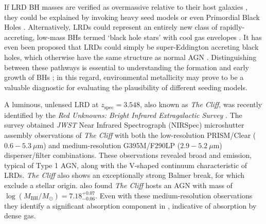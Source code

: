\documentclass[fleqn,usenatbib]{mnras}
\newcommand{\jwst}{\textit{JWST}\xspace}
\newcommand{\Halpha}{\text{H\textalpha}\xspace}
\newcommand{\Hbeta}{\text{H\textbeta}\xspace}
\newcommand{\cliff}{\textit{The Cliff}\xspace}
\begin{document}
If LRD BH masses are verified as overmassive relative to their host galaxies \citep[see][for example]{Juodzbalis2025_QSO1}, they could be explained by invoking heavy seed models or even Primordial Black Holes \citep[PBHs; see e.g.][]{Dayal2024, DayalMaiolino2026, Zhang2025_hydrosim,Ziparo2025}. Alternatively, LRDs could represent an entirely new class of rapidly-accreting, low-mass BHs termed `black hole stars' \citep[][]{Naidu2025, Begelman2026} with cool gas envelopes \citep{Liu2025, Kido2025}. 
It has even been proposed that LRDs could simply be super-Eddington accreting black holes, which otherwise have the same structure as normal AGN \citep[][]{MadauMaiolino2026,Madau2026b}. Distinguishing between these pathways is essential to understanding the formation and early growth of BHs \citep[e.g.,][]{Jeon_LRDs2026}; in this regard, environmental metallicity may prove to be a valuable diagnostic for evaluating the plausibility of different seeding models.




A luminous, unlensed LRD at $z_\mathrm{spec} = 3.548$, also known as \cliff, was recently identified by the \textit{Red Unknowns: Bright Infrared Extragalactic Survey} \citep[RUBIES;][]{RUBIES2025, deGraaff2025}. 
The survey obtained \jwst Near Infrared Spectrograph (NIRSpec) microshutter assembly \citep[MSA;][]{Jakobsen2022,Ferruit2022} observations of \cliff with both the low-resolution PRISM/Clear ($0.6 - 5.3 \ \mu$m) and medium-resolution G395M/F290LP ($2.9 - 5.2 ~\mu$m) disperser/filter combinations. 
These observations revealed broad \Hbeta and \Halpha emission, typical of Type 1 AGN, along with the V-shaped continuum characteristic of LRDs. 
\cliff also shows an exceptionally strong Balmer break, for which \cite{deGraaff2025} exclude a stellar origin. 
\cite{deGraaff2025} also found \cliff hosts an AGN with mass of $\log(M_\mathrm{BH}/M_\odot) = 7.18^{+0.07}_{-0.06}$. 
Even with these medium-resolution observations they identify a significant absorption component in \Halpha, indicative of absorption by dense gas.
\end{document}
